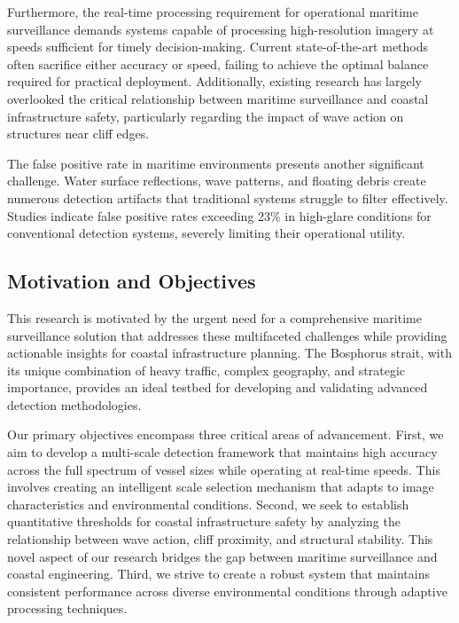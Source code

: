 \documentclass[10pt]{article}
\begin{document}
Furthermore, the real-time processing requirement for operational maritime surveillance demands systems capable of processing high-resolution imagery at speeds sufficient for timely decision-making. Current state-of-the-art methods often sacrifice either accuracy or speed, failing to achieve the optimal balance required for practical deployment. Additionally, existing research has largely overlooked the critical relationship between maritime surveillance and coastal infrastructure safety, particularly regarding the impact of wave action on structures near cliff edges.

The false positive rate in maritime environments presents another significant challenge. Water surface reflections, wave patterns, and floating debris create numerous detection artifacts that traditional systems struggle to filter effectively. Studies indicate false positive rates exceeding 23\% in high-glare conditions for conventional detection systems, severely limiting their operational utility.

\subsection{Motivation and Objectives}

This research is motivated by the urgent need for a comprehensive maritime surveillance solution that addresses these multifaceted challenges while providing actionable insights for coastal infrastructure planning. The Bosphorus strait, with its unique combination of heavy traffic, complex geography, and strategic importance, provides an ideal testbed for developing and validating advanced detection methodologies.

Our primary objectives encompass three critical areas of advancement. First, we aim to develop a multi-scale detection framework that maintains high accuracy across the full spectrum of vessel sizes while operating at real-time speeds. This involves creating an intelligent scale selection mechanism that adapts to image characteristics and environmental conditions. Second, we seek to establish quantitative thresholds for coastal infrastructure safety by analyzing the relationship between wave action, cliff proximity, and structural stability. This novel aspect of our research bridges the gap between maritime surveillance and coastal engineering. Third, we strive to create a robust system that maintains consistent performance across diverse environmental conditions through adaptive processing techniques.
\end{document}
